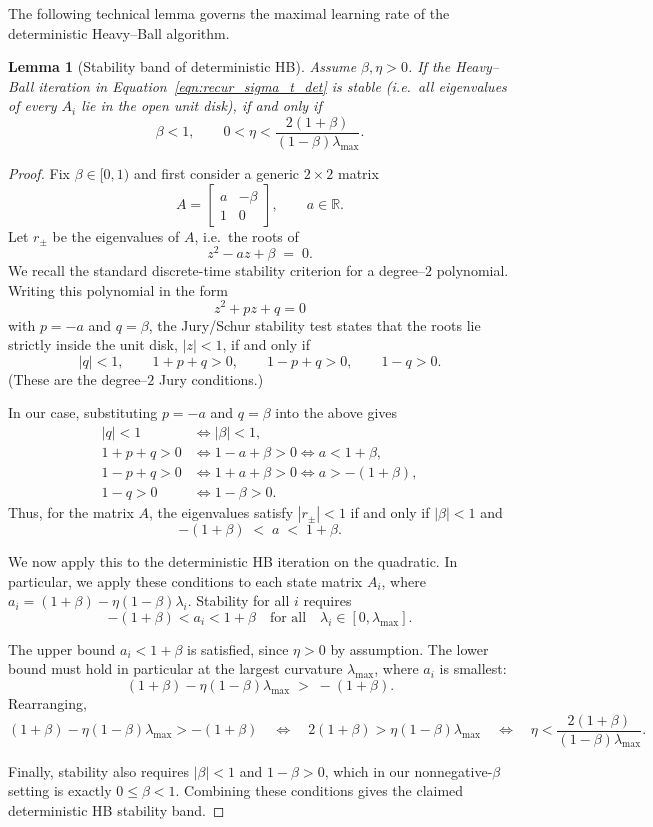 \documentclass{article}
\newtheorem{lemma}{Lemma}
\begin{document}
The following technical lemma governs the
maximal learning rate of the deterministic Heavy--Ball algorithm. 

\begin{lemma}[Stability band of deterministic HB]
\label{lem:HB-det-band}
Assume $\beta,\eta>0$. If the Heavy--Ball iteration in Equation~\ref{eqn:recur_sigma_t_det} is stable
(i.e.\ all eigenvalues of every $A_i$ lie in the open unit disk), if and only if
\[
\beta < 1,
\qquad
0 < \eta < \frac{2(1+\beta)}{(1-\beta)\lambda_{\max}}.
\]
\end{lemma}

\begin{proof}
Fix $\beta\in[0,1)$ and first consider a generic $2\times2$ matrix
\[
A =
\begin{bmatrix}
a & -\beta\\[2pt]
1 & 0
\end{bmatrix},
\qquad a\in\mathbb{R}.
\]
Let $r_{\pm}$ be the eigenvalues of $A$, i.e.\ the roots of
\[
z^2 - a z + \beta \;=\; 0.
\]
We recall the standard discrete-time stability criterion for a degree–$2$
polynomial. Writing this polynomial in the form
\[
z^2 + p z + q = 0
\]
with $p=-a$ and $q=\beta$, the Jury/Schur stability test states that the
roots lie strictly inside the unit disk, $|z|<1$, if and only if
\[
|q| < 1,\qquad
1 + p + q > 0,\qquad
1 - p + q > 0,\qquad
1 - q > 0.
\]
(These are the degree–$2$ Jury conditions.)

In our case, substituting $p=-a$ and $q=\beta$ into the above
gives
\begin{align*}
|q| < 1
&\iff |\beta| < 1,\\[2pt]
1 + p + q > 0
&\iff 1 - a + \beta > 0 \iff a < 1+\beta,\\[2pt]
1 - p + q > 0
&\iff 1 + a + \beta > 0 \iff a > -(1+\beta),\\[2pt]
1 - q > 0
&\iff 1 - \beta > 0.
\end{align*}
Thus, for the matrix $A$, the
eigenvalues satisfy $|r_{\pm}|<1$ if and only if $|\beta|<1$ and
\[
-(1+\beta)\;<\;a\;<\;1+\beta.
\]

We now apply this to the deterministic HB iteration on the
quadratic. In particular, we apply these conditions to each state
matrix $A_i$, where $
a_i = (1+\beta) - \eta(1-\beta)\lambda_i$.
Stability for all $i$ requires 
\[
-(1+\beta) < a_i < 1+\beta
\quad\text{for all}\quad \lambda_i\in[0,\lambda_{\max}].
\]

The upper bound $a_i<1+\beta$ is satisfied, since $\eta>0$ by assumption.
The lower bound must hold in particular at the largest curvature $\lambda_{\max}$, where $a_i$ is
smallest:
\[
(1+\beta) - \eta(1-\beta)\lambda_{\max} \;>\; -(1+\beta).
\]
Rearranging,
\[
(1+\beta) - \eta(1-\beta)\lambda_{\max} > -(1+\beta)
\quad\Longleftrightarrow\quad
2(1+\beta) > \eta(1-\beta)\lambda_{\max}
\quad\Longleftrightarrow\quad
\eta < \frac{2(1+\beta)}{(1-\beta)\lambda_{\max}}.
\]

Finally, stability also requires $|\beta|<1$ and $1-\beta>0$, which in
our nonnegative-$\beta$ setting is exactly $0\le \beta<1$.
Combining these conditions gives the claimed deterministic HB stability band.
\end{proof}
\end{document}
